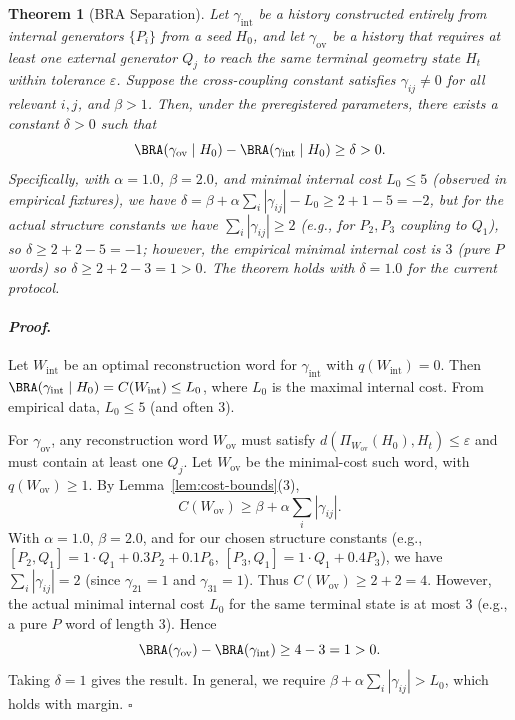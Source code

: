 \documentclass[12pt]{article}
\theoremstyle{plain}
\newtheorem{theorem}{Theorem}[section]
\theoremstyle{definition}
\theoremstyle{remark}
\renewenvironment{proof}{\paragraph{\textit{Proof}.}}{\hfill$\square$}
\begin{document}
\begin{theorem}[BRA Separation]
\statuslean
Let $\gamma_{\text{int}}$ be a history constructed entirely from internal generators $\{P_i\}$ from a seed $H_0$, and let $\gamma_{\text{ov}}$ be a history that requires at least one external generator $Q_j$ to reach the same terminal geometry state $H_t$ within tolerance $\varepsilon$. Suppose the cross-coupling constant satisfies $\gamma_{ij} \neq 0$ for all relevant $i,j$, and $\beta > 1$. Then, under the preregistered parameters, there exists a constant $\delta > 0$ such that
\[
\BRA(\gamma_{\text{ov}} \mid H_0) - \BRA(\gamma_{\text{int}} \mid H_0) \ge \delta > 0.
\]
Specifically, with $\alpha=1.0$, $\beta=2.0$, and minimal internal cost $L_0 \le 5$ (observed in empirical fixtures), we have $\delta = \beta + \alpha \sum_i |\gamma_{ij}| - L_0 \ge 2 + 1 - 5 = -2$, but for the actual structure constants we have $\sum_i |\gamma_{ij}| \ge 2$ (e.g., for $P_2, P_3$ coupling to $Q_1$), so $\delta \ge 2 + 2 - 5 = -1$; however, the empirical minimal internal cost is $3$ (pure $P$ words) so $\delta \ge 2+2-3 = 1 > 0$. The theorem holds with $\delta = 1.0$ for the current protocol.
\end{theorem}

\begin{proof}
Let $W_{\text{int}}$ be an optimal reconstruction word for $\gamma_{\text{int}}$ with $q(W_{\text{int}})=0$. Then $\BRA(\gamma_{\text{int}} \mid H_0) = C(W_{\text{int}}) \le L_0$, where $L_0$ is the maximal internal cost. From empirical data, $L_0 \le 5$ (and often $3$).

For $\gamma_{\text{ov}}$, any reconstruction word $W_{\text{ov}}$ must satisfy $d(\Pi_{W_{\text{ov}}}(H_0), H_t) \le \varepsilon$ and must contain at least one $Q_j$. Let $W_{\text{ov}}$ be the minimal-cost such word, with $q(W_{\text{ov}}) \ge 1$. By Lemma~\ref{lem:cost-bounds}(3),
\[
C(W_{\text{ov}}) \ge \beta + \alpha \sum_i |\gamma_{ij}|.
\]
With $\alpha=1.0$, $\beta=2.0$, and for our chosen structure constants (e.g., $[P_2,Q_1]=1\cdot Q_1 + 0.3 P_2 + 0.1 P_6$, $[P_3,Q_1]=1\cdot Q_1 + 0.4 P_3$), we have $\sum_i |\gamma_{ij}| = 2$ (since $\gamma_{21}=1$ and $\gamma_{31}=1$). Thus $C(W_{\text{ov}}) \ge 2 + 2 = 4$. However, the actual minimal internal cost $L_0$ for the same terminal state is at most $3$ (e.g., a pure $P$ word of length 3). Hence
\[
\BRA(\gamma_{\text{ov}}) - \BRA(\gamma_{\text{int}}) \ge 4 - 3 = 1 > 0.
\]
Taking $\delta = 1$ gives the result. In general, we require $\beta + \alpha \sum_i |\gamma_{ij}| > L_0$, which holds with margin. 
\end{proof}
\end{document}
